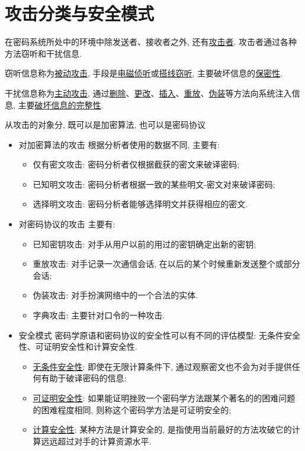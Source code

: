 \documentclass[UTF8]{ctexart}
\begin{document}
    \section{攻击分类与安全模式}
        在密码系统所处中的环境中除发送者、接收者之外, 还有\underline{攻击者}. 攻击者通过各种方法窃听和干扰信息.

        窃听信息称为\underline{被动攻击}, 手段是\underline{电磁侦听}或\underline{搭线窃听}, 主要破坏信息的\underline{保密性}.

        干扰信息称为\underline{主动攻击}, 通过\underline{删除}、\underline{更改}、\underline{插入}、\underline{重放}、\underline{伪装}等方法向系统注入信息, 主要\underline{破坏信息的完整性}.

        {
            \centering
            
        }

        从攻击的对象分, 既可以是加密算法, 也可以是密码协议

        \begin{itemize}
            \item 对加密算法的攻击
            根据分析者使用的数据不同, 主要有:
            \begin{itemize}
                \item 仅有密文攻击: 密码分析者仅根据截获的密文来破译密码;
                \item 已知明文攻击: 密码分析者根据一致的某些明文-密文对来破译密码;
                \item 选择明文攻击: 密码分析者能够选择明文并获得相应的密文.
            \end{itemize}
            \item 对密码协议的攻击
            主要有:
            \begin{itemize}
                \item 已知密钥攻击: 对手从用户以前的用过的密钥确定出新的密钥;
                \item 重放攻击: 对手记录一次通信会话, 在以后的某个时候重新发送整个或部分会话;
                \item 伪装攻击: 对手扮演网络中的一个合法的实体.
                \item 字典攻击: 主要针对口令的一种攻击.
            \end{itemize}

            \item 安全模式
            密码学原语和密码协议的安全性可以有不同的评估模型: 无条件安全性、可证明安全性和计算安全性.
            \begin{itemize}
                \item \underline{无条件安全性}: 即使在无限计算条件下, 通过观察密文也不会为对手提供任何有助于破译密码的信息;
                \item \underline{可证明安全性}: 如果能证明挫败一个密码学方法跟某个著名的的困难问题的困难程度相同, 则称这个密码学方法是可证明安全的;
                \item \underline{计算安全性}: 某种方法是计算安全的, 是指使用当前最好的方法攻破它的计算远远超过对手的计算资源水平.
            \end{itemize}
        \end{itemize}
\end{document}
